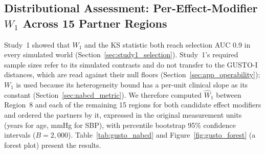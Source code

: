 \documentclass[AMA,Times1COL]{WileyNJDv5}
\begin{document}
\subsection{Distributional Assessment: Per-Effect-Modifier $W_1$ Across 15 Partner Regions}\label{sec:app_nabcd}

Study~1 showed that $W_1$ and the KS statistic both reach selection AUC 0.9 in every simulated world (Section~\ref{sec:study1_selection}). Study~1's required sample sizes refer to its simulated contrasts and do not transfer to the GUSTO-I distances, which are read against their null floors (Section~\ref{sec:app_operability}); $W_1$ is used because its heterogeneity bound has a per-unit clinical slope as its constant (Section~\ref{sec:nabcd_metric}). We therefore computed $\widehat{W}_1$ between Region~8 and each of the remaining 15 regions for both candidate effect modifiers and ordered the partners by it, expressed in the original measurement units (years for age, mmHg for SBP), with percentile bootstrap 95\% confidence intervals ($B = 2{,}000$). Table~\ref{tab:gusto_nabcd} and Figure~\ref{fig:gusto_forest} (a forest plot) present the results.
\end{document}
